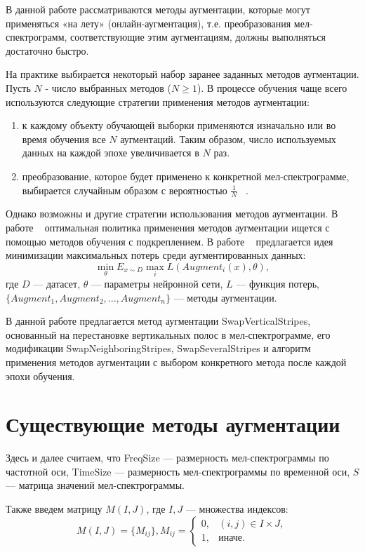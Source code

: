 \documentclass[12pt, fleqn]{article}
\begin{document}
В данной работе рассматриваются методы аугментации, которые могут применяться «на лету» (онлайн-аугментация), т.е. преобразования мел-спектрограмм, соответствующие этим аугментациям, должны выполняться достаточно быстро.

На практике выбирается некоторый набор заранее заданных методов аугментации. Пусть $N$ - число выбранных методов ($N \geq 1$). В процессе обучения чаще всего используются следующие стратегии применения методов аугментации:
\begin{enumerate}
    \item к каждому объекту обучающей выборки применяются изначально или во время обучения все $N$ аугментаций. Таким образом, число используемых данных на каждой эпохе увеличивается в $N$ раз.
    \item преобразование, которое будет применено к конкретной мел-спектрограмме, выбирается случайным образом с вероятностью $\frac{1}{N}$ ~\cite{RandAugment}.
\end{enumerate}

Однако возможны и другие стратегии использования методов аугментации. В работе ~\cite{AutoAugment} оптимальная политика применения методов аугментации ищется с помощью методов обучения с подкреплением. В работе ~\cite{MaxUp} предлагается идея минимизации максимальных потерь среди аугментированных данных: \newline
$$\min_{\theta} E_{x \sim D} \max_i L(Augment_i(x), \theta),$$ где $D$ --- датасет,
$\theta$ --- параметры нейронной сети, $L$ --- функция потерь, $\{Augment_1, Augment_2, ..., Augment_n\}$ --- методы аугментации.

В данной работе предлагается метод аугментации SwapVerticalStripes, основанный на перестановке вертикальных полос в мел-спектрограмме, его модификации SwapNeighboringStripes, SwapSeveralStripes и алгоритм применения методов аугментации с выбором конкретного метода после каждой эпохи обучения.

\section{Существующие методы аугментации}
Здесь и далее считаем, что FreqSize --- размерность мел-спектрограммы по частотной оси, TimeSize --- размерность мел-спектрограммы по временной оси, $S$ --- матрица значений мел-спектрограммы. 

Также введем матрицу $M(I, J)$, где $I, J$ --- множества индексов: \newline 
\begin{equation*}
M(I, J) = \{M_{ij}\},  M_{ij} = 
\begin{cases}
0, & (i,j) \in I \times J,\\
1, &\text{иначе}.
\end{cases}
\end{equation*}
\end{document}

